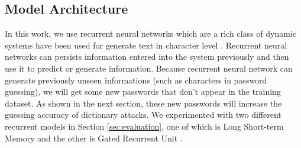 \documentclass[10pt, twocolumnjournal]{IEEEtran}
\begin{document}
\subsection{Model Architecture} 
In this work, we use recurrent neural networks which are a rich class of dynamic systems have been used for generate text in character level \cite{graves2013generating}. Recurrent neural networks can persists information entered into the system previously and then use it to predict or generate information. Because recurrent neural network can generate previously unseen informations (such as characters in password guessing), we will get some new passwords that don't appear in the training dataset. As shown in the next section, these new passwords will increase the guessing accuracy of dictionary attacks. We experimented with two different recurrent models in Section \ref{sec:evaluation}, one of which is Long Short-term Memory\cite{hochreiter1997long} and the other is Gated Recurrent Unit \cite{chung2014empirical}\cite{jozefowicz2015empirical}.
\end{document}
